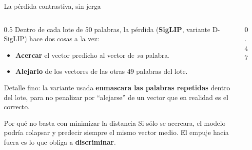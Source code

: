 \documentclass[aspectratio=169,10pt]{beamer}
\newcommand{\term}[1]{\textbf{\color{deepgreen}#1}}
\begin{document}
\begin{frame}[c]{La pérdida contrastiva, sin jerga}
  \small
  \begin{columns}[c,totalwidth=\linewidth]
    \begin{column}{0.5\linewidth}
      Dentro de cada lote de 50 palabras, la pérdida (\term{SigLIP}, variante D-SigLIP) hace dos cosas a la vez:
      \begin{itemize}
        \item \term{Acercar} el vector predicho al vector de \emph{su} palabra.
        \item \term{Alejarlo} de los vectores de las otras 49 palabras del lote.
      \end{itemize}
      \vspace{2mm}
      {\footnotesize Detalle fino: la variante usada \term{enmascara las palabras repetidas} dentro del lote, para no penalizar por ``alejarse'' de un vector que en realidad es el correcto.}
      \vspace{2mm}
      \begin{block}{Por qué no basta con minimizar la distancia}
        \footnotesize Si sólo se acercara, el modelo podría colapsar y predecir siempre el mismo vector medio. El empuje hacia fuera es lo que obliga a \term{discriminar}.
      \end{block}
    \end{column}
    \begin{column}{0.47\linewidth}
      \centering
    \end{column}
  \end{columns}
\end{frame}
\end{document}
